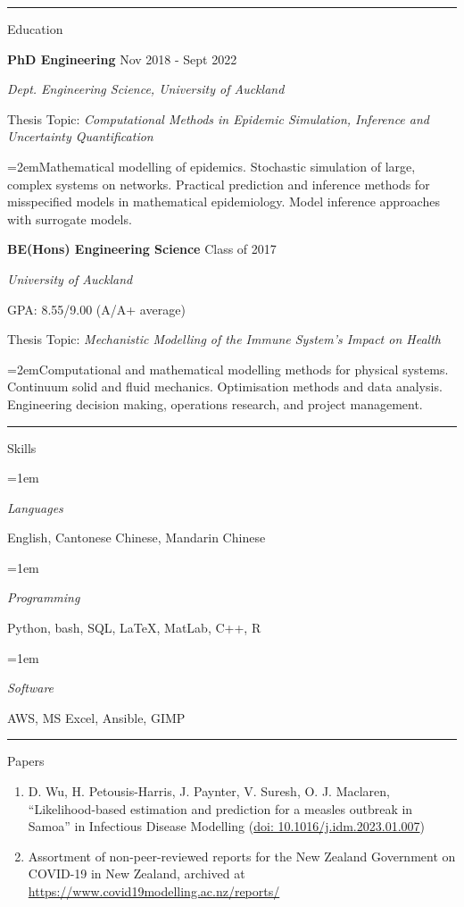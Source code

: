 \documentclass[paper=a4paper,fontsize=11pt]{scrartcl}
\newcommand{\pagerule}[1][2pt]{\noindent\rule{\textwidth}{#1}}
\newcommand{\usingfont}[2]{#1 #2 \par \normalsize \normalfont}
\newcommand{\sectionheader}[1]{\pagerule \vspace{0.05ex} \usingfont{\usefont{T1}{phv}{m}{v} \Large}{\noindent \hspace{-0.5em} #1} \vspace{0.5ex}}
\newlength{\spacebox}
\newcommand{\indented}[1][2em]{\noindent\hangindent=#1\hangafter=0}
\begin{document}
\sectionheader{Education}
\noindent \textbf{PhD Engineering} \hfill
Nov 2018 - Sept 2022 \par
\noindent \textit{Dept. Engineering Science, University of
Auckland} \par
\small Thesis Topic: \emph{Computational Methods in Epidemic Simulation,
Inference and Uncertainty Quantification} \par
\indented \small Mathematical modelling of epidemics. Stochastic
simulation of large, complex systems on networks. Practical prediction
and inference methods for misspecified models in mathematical
epidemiology. Model inference approaches with surrogate models.
\normalsize \par\par
\noindent \textbf{BE(Hons) Engineering Science} \hfill
Class of 2017 \par
\noindent \textit{University of Auckland} \par
\small GPA: 8.55/9.00 (A/A+ average) \par
\small Thesis Topic: \emph{Mechanistic Modelling of the Immune System's
Impact on Health} \par
\indented \small Computational and mathematical modelling methods for
physical systems. Continuum solid and fluid mechanics. Optimisation
methods and data analysis. Engineering decision making, operations
research, and project management.
\normalsize \par\par

\sectionheader{Skills}
\indented[1em] \parbox{\spacebox}{\textit{Languages}} 
\hspace{1.5em} English, Cantonese Chinese, Mandarin Chinese
\par
\indented[1em] \parbox{\spacebox}{\textit{Programming}} 
\hspace{1.5em} Python, bash, SQL, \LaTeX, MatLab, C++, R
\par
\indented[1em] \parbox{\spacebox}{\textit{Software}} 
\hspace{1.5em} AWS, MS Excel, Ansible, GIMP
\par

\sectionheader{Papers}
\vspace{-2ex}
\begin{enumerate}
\itemsep-0.25em
\item 
D. Wu, H. Petousis-Harris, J. Paynter, V. Suresh, O. J.
Maclaren, ``Likelihood-based estimation and prediction for a measles
outbreak in Samoa'' in Infectious Disease
Modelling (\href{https://doi.org/10.1016/j.idm.2023.01.007}{doi:
10.1016/j.idm.2023.01.007})
\item 
Assortment of non-peer-reviewed reports for the New Zealand Government
on COVID-19 in New Zealand, archived at
\url{https://www.covid19modelling.ac.nz/reports/}
\end{enumerate}
\vspace{-2ex}
\end{document}
